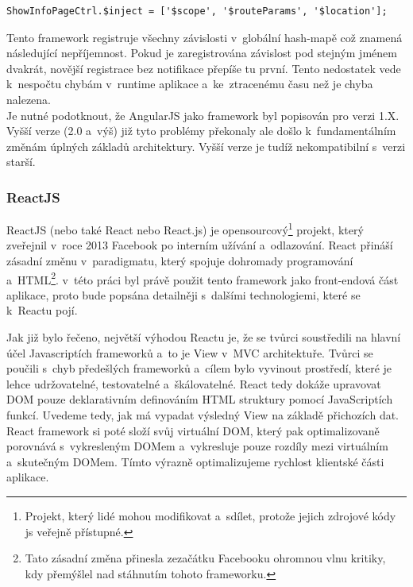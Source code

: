 \vspace{5mm}

\begin{lstlisting}[numbers=none, caption=Vložení závislosti do vlasnosti \textit{\$inject}, label=lst:ngDependencyInjectionFix2]
ShowInfoPageCtrl.$inject = ['$scope', '$routeParams', '$location'];
\end{lstlisting}

Tento framework registruje všechny závislosti v~globální hash-mapě což znamená následující nepříjemnost. Pokud je zaregistrována závislost pod stejným jménem dvakrát, novější registrace bez notifikace přepíše tu první. Tento nedostatek vede k~nespočtu chybám v~runtime aplikace a~ke~ztracenému času než je chyba nalezena.  \\

Je nutné podotknout, že AngularJS jako framework byl popisován pro verzi 1.X. Vyšší verze (2.0 a~výš) již tyto problémy překonaly ale došlo k~fundamentálním změnám úplných základů architektury. Vyšší verze je tudíž nekompatibilní s~verzi starší.\cite{16, 17}

\subsubsection{ReactJS}
\label{sec:ReactJS}

ReactJS (nebo také React nebo React.js) je opensourcový\footnote{Projekt, který lidé mohou modifikovat a~sdílet, protože jejich zdrojové kódy js veřejně přístupné.} projekt, který zveřejnil v~roce 2013 Facebook po interním užívání a~odlazování. React přináší zásadní změnu v~paradigmatu, který spojuje dohromady programování a~HTML\footnote{Tato zásadní změna přinesla zezačátku Facebooku ohromnou vlnu kritiky, kdy přemýšlel nad stáhnutím tohoto frameworku.}. v~této práci byl právě použit tento framework jako front-endová část aplikace, proto bude popsána detailněji s~dalšími technologiemi, které se k~Reactu pojí. 

Jak již bylo řečeno, největší výhodou Reactu je, že se tvůrci soustředili na hlavní účel Javascriptích frameworků a~to je View v~MVC architektuře. Tvůrci se poučili s~chyb předešlých frameworků a~cílem bylo vyvinout prostředí, které je lehce udržovatelné, testovatelné a~škálovatelné. React tedy dokáže upravovat DOM pouze deklarativním definováním HTML struktury pomocí JavaScriptích funkcí. Uvedeme tedy, jak má vypadat výsledný View na základě přichozích dat. React framework si poté složí svůj virtuální DOM, který pak optimalizovaně porovnává s~vykresleným DOMem a~vykresluje pouze rozdíly mezi virtuálním a~skutečným DOMem. Tímto výrazně optimalizujeme rychlost klientské části aplikace. \\

